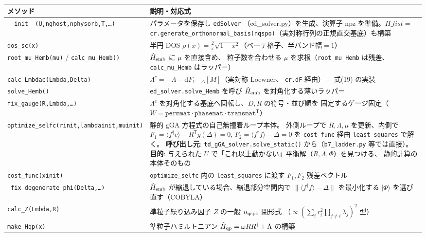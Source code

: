 \documentclass[11pt]{ltjsarticle}
\newcommand{\code}[1]{\texttt{#1}}
\begin{document}
\begin{longtable}{p{}p{}}
\toprule
メソッド & 説明・対応式 \\
\midrule
\code{\_\_init\_\_(U,nghost,nphysorb,T,\ldots)} & パラメータを保存し \code{edSolver}
（ed\_solver.py）を生成、演算子 npz を準備。$H\_list=$
\code{cr.generate\_orthonormal\_basis(nqspo)}（実対称行列の正規直交基底）も構築 \\
\code{dos\_sc(x)} & 半円 DOS $\rho(x)=\frac{2}{\pi}\sqrt{1-x^2}$（ベーテ格子、半バンド幅$=1$）\\
\code{root\_mu\_Hemb(mu)} / \code{calc\_mu\_Hemb()} & $\hat H_{\rm emb}$ に $\mu$ を直接含め、
粒子数を合わせる $\mu$ を求根（\code{root\_mu\_Hemb} は残差、\code{calc\_mu\_Hemb} はラッパー）\\
\code{calc\_Lmbdac(Lmbda,Delta)} & $\Lambda^c=-\Lambda-\mathrm{d}F_{1-\Delta}[M]$（実対称 Loewner、
\code{cr.dF} 経由）— 式(19) の実装 \\
\code{solve\_Hemb()} & \code{ed\_solver.solve\_Hemb} を呼び $\hat H_{\rm emb}$ を対角化する薄いラッパー \\
\code{fix\_gauge(R,Lmbda,\ldots)} & $\Lambda^c$ を対角化する基底へ回転し、$D,R$ の符号・並び順を
固定するゲージ固定（$W=\code{permmat}\cdot\code{phasemat}\cdot\code{transmat}^{\mathsf T}$）\\
\code{optimize\_selfc(rinit,lambdainit,muinit)} & 静的 gGA 方程式の自己無撞着ループ本体。
外側ループで $R,\Lambda,\mu$ を更新、内側で $F_1=\langle f^\dagger c\rangle-R^{\mathsf T}g(\Delta)=0$,
$F_2=\langle f^\dagger f\rangle-\Delta=0$ を \code{cost\_func} 経由 \code{least\_squares} で解く。
\textbf{呼び出し元}: \code{td\_gGA\_solver.solve\_static()} から（\code{b7\_ladder.py} 等では直接）。
\textbf{目的}: 与えられた $U$ で「これ以上動かない」平衡解（$R,\Lambda,\Phi$）を見つける、
静的計算の本体そのもの \\
\code{cost\_func(xinit)} & \code{optimize\_selfc} 内の \code{least\_squares} に渡す $F_1,F_2$ 残差ベクトル \\
\code{\_fix\_degenerate\_phi(Delta,\ldots)} & $\hat H_{\rm emb}$ が縮退している場合、縮退部分空間内で
$\|\langle f^\dagger f\rangle-\Delta\|$ を最小化する $|\Phi\rangle$ を選び直す（COBYLA） \\
\code{calc\_Z(Lmbda,R)} & 準粒子繰り込み因子 $Z$ の一般 $n_{\rm qspo}$ 閉形式
（$\propto(\sum_i r_i^2\prod_{j\neq i}\lambda_j)^2$ 型）\\
\code{make\_Hqp(x)} & 準粒子ハミルトニアン $\hat H_{\rm qp}=\omega RR^\dagger+\Lambda$ の構築 \\

\end{longtable}
\end{document}
